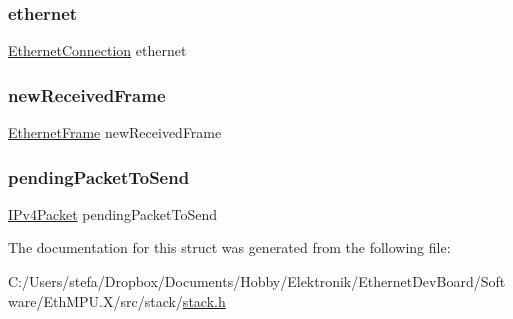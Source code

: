 \subsubsection{\texorpdfstring{ethernet}{ethernet}}
{\footnotesize\ttfamily \mbox{\hyperlink{ethernet_types_8h_a79416248249faca249ce5028e909f667}{Ethernet\+Connection}} ethernet}

\mbox{\label{struct_system___acce4d7d9a581bdc9e2d7f6baafc4915f}} 
\subsubsection{\texorpdfstring{newReceivedFrame}{newReceivedFrame}}
{\footnotesize\ttfamily \mbox{\hyperlink{ethernet_types_8h_a4ebb2d31f9c7739f76b97c8ee0a7b702}{Ethernet\+Frame}} new\+Received\+Frame}

\mbox{\label{struct_system___a5b1fe5efc3ada8a585cde6c6b08dbb67}} 
\subsubsection{\texorpdfstring{pendingPacketToSend}{pendingPacketToSend}}
{\footnotesize\ttfamily \mbox{\hyperlink{group__ipv4_ga1a3db8172a6bdf4bb1957929ca11710c}{I\+Pv4\+Packet}} pending\+Packet\+To\+Send}



The documentation for this struct was generated from the following file\+:\begin{DoxyCompactItemize}
\item 
C\+:/\+Users/stefa/\+Dropbox/\+Documents/\+Hobby/\+Elektronik/\+Ethernet\+Dev\+Board/\+Software/\+Eth\+M\+P\+U.\+X/src/stack/\mbox{\hyperlink{stack_8h}{stack.\+h}}\end{DoxyCompactItemize}
